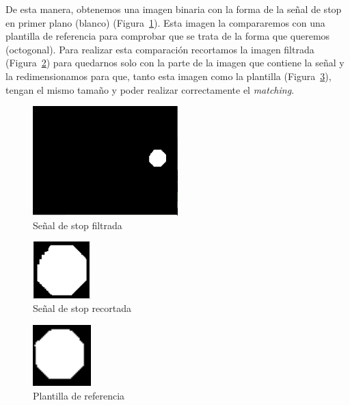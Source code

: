 De esta manera, obtenemos una imagen binaria con la forma de la señal de stop en primer plano (blanco) (Figura~\ref{fig.close}). Esta imagen la compararemos con una plantilla de referencia para comprobar que se trata de la forma que queremos (octogonal). Para realizar esta comparación recortamos la imagen filtrada (Figura~\ref{fig.cut}) para quedarnos solo con la parte de la imagen que contiene la señal y la redimensionamos para que, tanto esta imagen como la plantilla (Figura~\ref{fig.template}), tengan el mismo tamaño y poder realizar correctamente el \textit{matching}. \\

\begin{figure}[H]
  \begin{center}
    \includegraphics[width=0.5\textwidth]{figures/Stop/close.jpg}
		\caption{Señal de stop filtrada}
		\label{fig.close}
		\end{center}
\end{figure}

\begin{figure}[H]
  \begin{center}
    \includegraphics[width=0.2\textwidth]{figures/Stop/cut.jpg}
		\caption{Señal de stop recortada}
		\label{fig.cut}
		\end{center}
\end{figure}

\begin{figure}[H]
  \begin{center}
    \includegraphics[width=0.2\textwidth]{figures/Stop/template.png}
		\caption{Plantilla de referencia}
		\label{fig.template}
		\end{center}
\end{figure}

